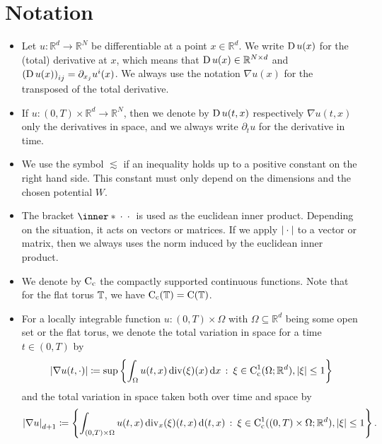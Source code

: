 \chapter{Notation}


	\begin{itemize}[leftmargin=*]
		\item	
		Let $ u \colon \mathbb{ R }^{ d } \to \mathbb{ R }^{ N } $ be 
		differentiable at a point $ x \in \mathbb{ R }^{d } $. We write $ \operatorname{D} 
		u ( x ) $ for the (total) derivative at $ x $, which means that
		$ \operatorname{D} u ( x ) \in \mathbb{ R }^{ N \times d } $ and
		$ \left( \operatorname{D} u ( x ) \right)_{ i j } = \partial_{ x_{ j } } u^{ i } ( 
		x ) $. We always use the notation $ \nabla u ( x ) $ for the transposed 
		of the total derivative. 
		
		\item
		If $ u \colon ( 0 , T ) \times \mathbb{ R }^{ d } \to \mathbb{ R 
		}^{ N } $, then we denote by $ \operatorname{D} u (t, x ) $  respectively $ \nabla 
		u ( 
		t,  x ) $ only the derivatives in space, and we always write $ 
		\partial_{ 
		t } u $ for the derivative in time.
	
		\item
		We use the symbol $ \lesssim $ if an inequality holds up to a positive 
		constant on the right hand side. This constant must only depend on the 
		dimensions and the chosen potential $ W $.
		
		\item 
		The bracket $ \inner*{\:\cdot\:}{\:\cdot\:} $ is used as the euclidean 
		inner 
		product. Depending on the situation, it acts on vectors or matrices.
		If we apply $ \abs{ \:\cdot\: } $ to a vector or matrix, then we always 
		uses the norm induced by the euclidean inner product.
		
		\item 
		We denote by $ \operatorname{C}_{ \mathrm{c} } $ the compactly supported 
		continuous functions. Note that for the flat torus $ \operatorname{\mathbb{T}} $, we 
		have $ \operatorname{C}_{ \mathrm{c} } ( \operatorname{\mathbb{T}} ) = \operatorname{C} ( \operatorname{\mathbb{T}} ) $.
		
		\item
		For a locally integrable function $ u \colon ( 0 , T ) \times \Omega $ 
		with $ \Omega \subseteq \mathbb{ R }^{ d } $ being some open set or the 
		flat torus, we denote the total variation in space for a time $ t \in ( 
		0 , T ) $ by
		\begin{equation*}
			\abs{ \nabla u ( t , \cdot ) }
			\coloneqq
			\sup 
			\left\{
				\int_{ \Omega }
					u ( t , x ) \operatorname{div} ( \xi ) ( x ) 
				\dd{ x }
				\, \colon \,
				\xi \in \operatorname{C}_{ \mathrm{c} }^{ 1 } ( \Omega ; \mathbb{ R }^{ d 
				} ) , \abs{ \xi } \leq 1
			\right\}
		\end{equation*}	
		and the total variation in space taken both over time and space by
		\begin{equation*}
			\abs{ \nabla u }_{ d + 1 }
			\coloneqq
			\left\{
			\int_{ ( 0 , T ) \times \Omega }
			u ( t , x ) \operatorname{div}_{ x } ( \xi ) (t , x ) 
			\dd{ ( t, x ) }
			\, \colon \,
			\xi \in \operatorname{C}_{ \mathrm{c} }^{ 1 } (( 0 , T ) \times \Omega ; 
			\mathbb{ R }^{ d 
			} ) , \abs{ \xi } \leq 1
			\right\}.
		\end{equation*}
	

\end{itemize}
